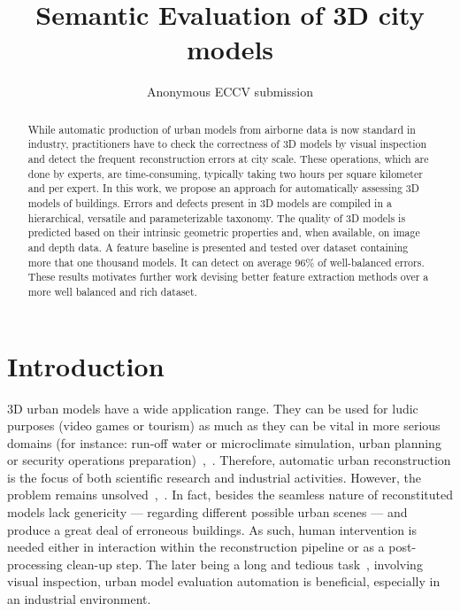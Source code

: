 \documentclass[runningheads]{llncs}
\begin{document}
\pagestyle{headings}
\mainmatter{}
\def\ECCV18SubNumber{***}  %

\title{Semantic Evaluation of 3D city models}

\titlerunning{ECCV-18 submission ID \ECCV18SubNumber}

\authorrunning{ECCV-18 submission ID \ECCV18SubNumber}

\author{Anonymous ECCV submission}
\institute{Paper ID \ECCV18SubNumber}

\maketitle

\begin{abstract}
    While automatic production of urban models from airborne data is now standard in industry, practitioners have to check the correctness of 3D models by visual inspection and detect the frequent reconstruction errors at city scale. These operations, which are done by experts, are time-consuming, typically taking two hours per square kilometer and per expert. In this work, we propose an approach for automatically assessing 3D models of buildings. Errors and defects present in 3D models are compiled in a hierarchical, versatile and parameterizable taxonomy. The quality of 3D models is predicted based on their intrinsic geometric properties and, when available, on image and depth data. A feature baseline is presented and tested over dataset containing more that one thousand models. It can detect on average $96\%$ of well-balanced errors. These results motivates further work devising better feature extraction methods over a more well balanced and rich dataset.
\end{abstract}

\section{Introduction}

    3D urban models have a wide application range. They can be used for ludic purposes (video games or tourism) as much as they can be vital in more serious domains (for instance: run-off water or microclimate simulation, urban planning or security operations preparation)~\cite{Biljecki2015},~\cite{Musialski2012}. Therefore, automatic urban reconstruction is the focus of both scientific research and industrial activities. However, the problem remains unsolved~\cite{Musialski2012},~\cite{rottensteiner2014results}. In fact, besides the seamless nature of reconstituted models lack genericity --- regarding different possible urban scenes --- and produce a great deal of erroneous buildings. As such, human intervention is needed either in interaction within the reconstruction pipeline or as a post-processing clean-up step. The later being a long and tedious task~\cite{Musialski2012}, involving visual inspection, urban model evaluation automation is beneficial, especially in an industrial environment.
\end{document}
